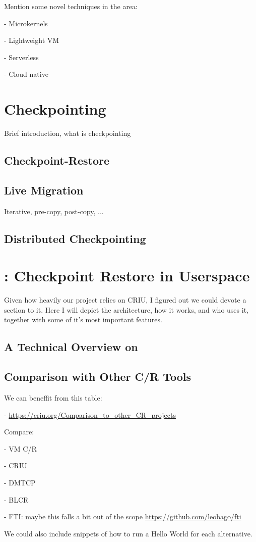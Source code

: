 Mention some novel techniques in the area:

- Microkernels

- Lightweight VM

- Serverless

- Cloud native

\section{Checkpointing}

Brief introduction, what is checkpointing

\subsection{Checkpoint-Restore}

\subsection{Live Migration}

Iterative, pre-copy, post-copy, ... \cite{Clark2005}

\subsection{Distributed Checkpointing}

\section{\criu: Checkpoint Restore in Userspace}

Given how heavily our project relies on CRIU, I figured out we could devote a section to it.
Here I will depict the architecture, how it works, and who uses it, together with some of it's most important features.

\subsection{A Technical Overview on \criu}

\subsection{Comparison with Other C/R Tools}

We can beneffit from this table:

- \url{https://criu.org/Comparison_to_other_CR_projects}

Compare:

- VM C/R

- CRIU

- DMTCP

- BLCR

- FTI: maybe this falls a bit out of the scope \url{https://github.com/leobago/fti}

We could also include snippets of how to run a Hello World for each alternative.

